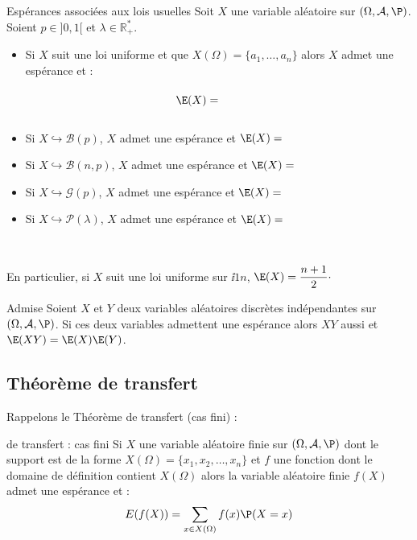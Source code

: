 \documentclass[french,11pt,twoside]{VcCours}
\begin{document}
\begin{Demonstration}{}
\vspace{10cm}
\end{Demonstration}

\begin{Theoreme}{Espérances associées aux lois usuelles}
Soit $X$ une variable aléatoire sur $(\Omega, \mathcal{A}, \P)$. Soient $p \in ]0,1[$ et $\lambda \in \mathbb{R}_+^{*}$.

\begin{itemize}
\item Si $X$ suit une loi uniforme et que $X(\Omega)= \lbrace a_1, \ldots, a_n \rbrace$ alors $X$ admet une espérance et :
$$ \E(X) = \phantom{\dfrac{1}{n} \sum_{i = 1}^n a_i}$$
\item Si $X \hookrightarrow \mathcal{B}(p)$, $X$ admet une espérance et $\E(X)=$
\item Si $X \hookrightarrow \mathcal{B}(n,p)$, $X$ admet une espérance et $\E(X)=$
\item Si $X \hookrightarrow \mathcal{G}(p)$, $X$ admet une espérance et $\E(X)= $
\item Si $X \hookrightarrow \mathcal{P}(\lambda)$, $X$ admet une espérance et $\E(X)=$
\end{itemize}
\end{Theoreme}

\newpage

$\phantom{}$
\begin{Demonstration}{}
\vspace{12cm}
\end{Demonstration}

\begin{Remarque}{} En particulier, si $X$ suit une loi uniforme sur $\ii{1}{n}$, $\E(X) = \dfrac{n+1}{2} \cdot$
\end{Remarque}

\begin{Proposition}{Admise} Soient $X$ et $Y$ deux variables aléatoires discrètes indépendantes sur $(\Omega, \mathcal{A}, \P)$. Si ces deux variables admettent une espérance alors $XY$ aussi et $\E(XY)=\E(X)\E(Y)$.
\end{Proposition}
\subsection{Théorème de transfert}

Rappelons le Théorème de transfert (cas fini) : 


\begin{Theoreme}{de transfert : cas fini}
Si $X$ une variable aléatoire finie sur $(\Omega, \mathcal{A}, \P)$ dont le support est de la forme $X(\Omega) = \{x_1, x_2, \ldots, x_n\}$ et $f$ une fonction dont le domaine de définition contient $X(\Omega)$ alors la variable aléatoire finie $f(X)$ admet une espérance et :
 $$ E(f(X)) = \sum_{x \in X(\Omega)} f(x) \P(X=x)$$
 \end{Theoreme}
\end{document}
